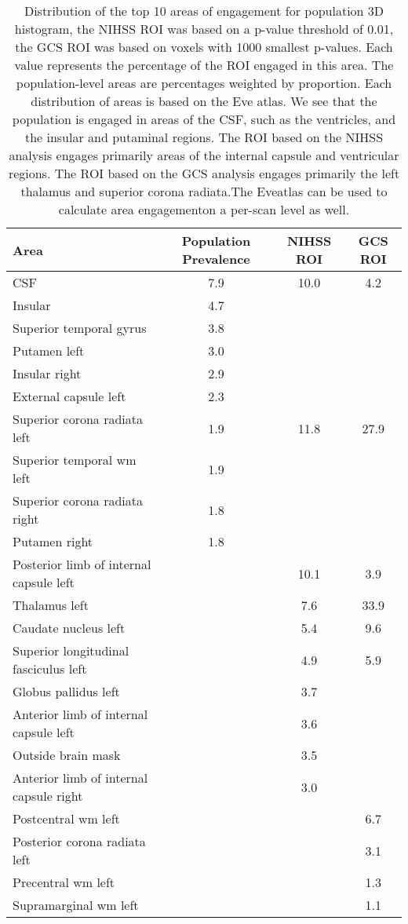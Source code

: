 \begin{table}[ht]
\centering
\begin{tabular}{lccc}
  \hline
Area & Population Prevalence & NIHSS ROI & GCS ROI \\ 
  \hline
CSF & 7.9 & 10.0 & 4.2 \\ 
  Insular & 4.7 &  &  \\ 
  Superior temporal gyrus & 3.8 &  &  \\ 
  Putamen left & 3.0 &  &  \\ 
  Insular right & 2.9 &  &  \\ 
  External capsule left & 2.3 &  &  \\ 
  Superior corona radiata left & 1.9 & 11.8 & 27.9 \\ 
  Superior temporal wm left & 1.9 &  &  \\ 
  Superior corona radiata right & 1.8 &  &  \\ 
  Putamen right & 1.8 &  &  \\ 
  Posterior limb of internal capsule left &  & 10.1 & 3.9 \\ 
  Thalamus left &  & 7.6 & 33.9 \\ 
  Caudate nucleus left &  & 5.4 & 9.6 \\ 
  Superior longitudinal fasciculus left &  & 4.9 & 5.9 \\ 
  Globus pallidus left &  & 3.7 &  \\ 
  Anterior limb of internal capsule left &  & 3.6 &  \\ 
  Outside brain mask &  & 3.5 &  \\ 
  Anterior limb of internal capsule right &  & 3.0 &  \\ 
  Postcentral wm left &  &  & 6.7 \\ 
  Posterior corona radiata left &  &  & 3.1 \\ 
  Precentral wm left &  &  & 1.3 \\ 
  Supramarginal wm left &  &  & 1.1 \\ 
   \hline
\end{tabular}
\caption{Distribution of the top 10 areas of engagement for population  3D histogram, the NIHSS ROI was based on a p-value  threshold of 0.01, the GCS ROI was based on voxels with 1000 smallest p-values.  Each value represents the percentage of the ROI engaged in this area.  The population-level areas are percentages weighted by proportion. Each distribution  of areas is based on the Eve atlas.  We see that the population is engaged in areas of the CSF, such as the ventricles, and  the insular and putaminal regions. The ROI based on the NIHSS analysis engages primarily areas of the internal capsule and ventricular regions. The ROI based on the GCS analysis engages primarily the left thalamus and superior corona radiata.The Eveatlas can be used to calculate area engagementon a per-scan level as well.} 
\label{t:breakdown}
\end{table}
